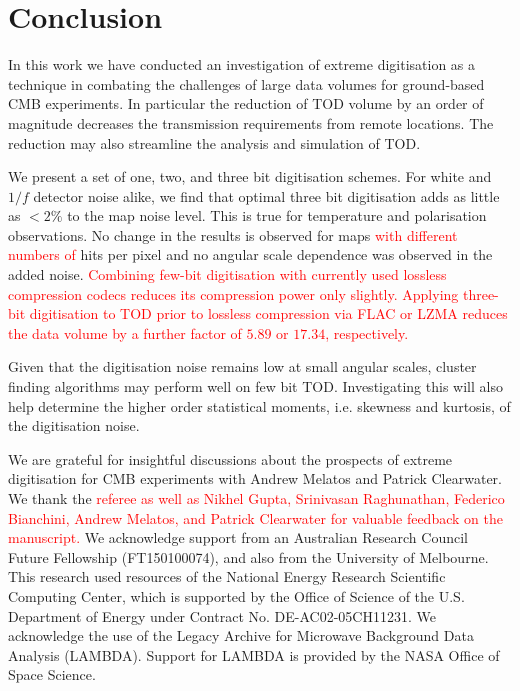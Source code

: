 \documentclass[apj]{emulateapj}
\newcommand{\changed}[1]{\textcolor{Red}{#1}}
\begin{document}
\section{Conclusion}
\label{sec:conclusions}

In this work we have conducted an investigation of extreme digitisation as a technique in combating the challenges of large data volumes for ground-based CMB experiments. In particular the reduction of TOD volume by an order of magnitude decreases the transmission requirements from remote locations. The reduction may also streamline the analysis and simulation of TOD.

We present a set of one, two, and three bit digitisation schemes. For white and $1/f$ detector noise alike, we find that optimal three bit digitisation adds as little as $<2\%$ to the map noise level. This is true for temperature and polarisation observations. No change in the results is observed for maps \changed{with different numbers of} hits per pixel and no angular scale dependence was observed in the added noise. \changed{Combining few-bit digitisation with currently used lossless compression codecs reduces its compression power only slightly. Applying three-bit digitisation to TOD prior to lossless compression via FLAC or LZMA reduces the data volume by a further factor of $5.89$ or $17.34$, respectively.}

Given that the digitisation noise remains low at small angular scales, cluster finding algorithms may perform well on few bit TOD. Investigating this will also help determine the higher order statistical moments, i.e. skewness and kurtosis, of the digitisation noise.

\acknowledgments %


We are grateful for insightful discussions about the prospects of extreme digitisation for CMB experiments with Andrew Melatos and Patrick Clearwater.
We thank the \changed{referee as well as Nikhel Gupta, Srinivasan Raghunathan, Federico Bianchini, Andrew Melatos, and Patrick Clearwater for valuable feedback on the manuscript.}
We acknowledge support from an Australian Research Council Future Fellowship (FT150100074), and also from the University of Melbourne. 
This research used resources of the National Energy Research Scientific Computing Center, which is supported by the Office of Science of the U.S. Department of Energy under Contract No. DE-AC02-05CH11231. 
We acknowledge the use of the Legacy Archive for Microwave Background Data Analysis (LAMBDA). Support for LAMBDA is provided by the NASA Office of Space Science.
\end{document}

